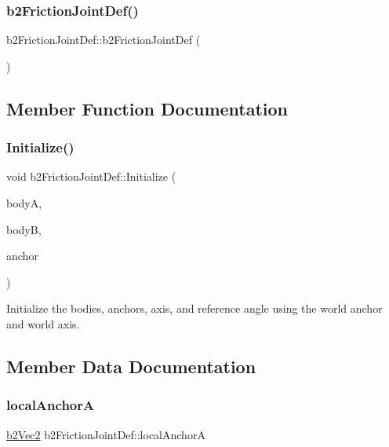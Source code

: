 \subsubsection{\texorpdfstring{b2FrictionJointDef()}{b2FrictionJointDef()}}
{\footnotesize\ttfamily b2\+Friction\+Joint\+Def\+::b2\+Friction\+Joint\+Def (\begin{DoxyParamCaption}{ }\end{DoxyParamCaption})\hspace{0.3cm}{\ttfamily [inline]}}



\subsection{Member Function Documentation}
\mbox{\label{structb2_friction_joint_def_aee104f2aeb34dec4e17e3c52a98f7915}} 
\subsubsection{\texorpdfstring{Initialize()}{Initialize()}}
{\footnotesize\ttfamily void b2\+Friction\+Joint\+Def\+::\+Initialize (\begin{DoxyParamCaption}\item[{\mbox{\hyperlink{classb2_body}{b2\+Body}} $\ast$}]{bodyA,  }\item[{\mbox{\hyperlink{classb2_body}{b2\+Body}} $\ast$}]{bodyB,  }\item[{const \mbox{\hyperlink{structb2_vec2}{b2\+Vec2}} \&}]{anchor }\end{DoxyParamCaption})}

Initialize the bodies, anchors, axis, and reference angle using the world anchor and world axis. 

\subsection{Member Data Documentation}
\mbox{\label{structb2_friction_joint_def_a00b246e60ae282a956a42b662993e92a}} 
\subsubsection{\texorpdfstring{localAnchorA}{localAnchorA}}
{\footnotesize\ttfamily \mbox{\hyperlink{structb2_vec2}{b2\+Vec2}} b2\+Friction\+Joint\+Def\+::local\+AnchorA}



